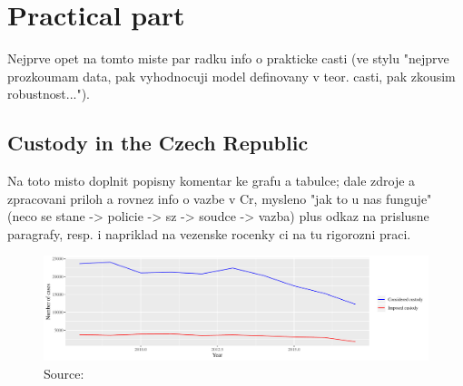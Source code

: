 \documentclass[12pt, twoside]{book} %
\begin{document}
\chapter{Practical part}        %

Nejprve opet na tomto miste par radku info o prakticke casti (ve stylu "nejprve prozkoumam data, pak vyhodnocuji model definovany v teor. casti, pak zkousim robustnost...").


\section{Custody in the Czech Republic}      %

Na toto misto doplnit popisny komentar ke grafu a tabulce; dale zdroje a zpracovani priloh a rovnez info o 
vazbe v Cr, mysleno "jak to u nas funguje" (neco se stane -> policie -> sz -> soudce -> vazba) plus odkaz na prislusne paragrafy, resp. i napriklad na vezenske rocenky ci na tu rigorozni praci. 


\begin{figure}
\includegraphics[width=\textwidth]{plot_21_1.pdf}
Source:
\end{figure}

\newpage
\end{document}
